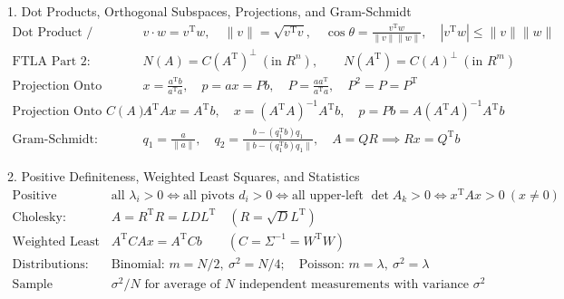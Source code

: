 \documentclass[11pt,a4paper,openany,oneside]{book}
\def\vect#1{#1}%
\def\uv#1{#1}%
\def\mathbf#1{#1}%
\newcommand{\vect}[1]{\mathbf{#1}}
\newcommand{\uv}[1]{\hat{\mathbf{#1}}}
\newcommand{\T}{\mathrm{T}}
\numberwithin{equation}{chapter}
\begin{document}
\begin{fs}{1. Dot Products, Orthogonal Subspaces, Projections, and Gram-Schmidt}
\begin{align*}
  \text{Dot Product / Length:}\quad & \vect{v}\cdot\vect{w} = \vect{v}^\T\vect{w}, \quad \|\vect{v}\| = \sqrt{\vect{v}^\T\vect{v}}, \quad \cos\theta = \frac{\vect{v}^\T\vect{w}}{\|\vect{v}\|\|\vect{w}\|}, \quad |\vect{v}^\T\vect{w}| \le \|\vect{v}\|\|\vect{w}\|\\
  \text{FTLA Part 2:}\quad & N(A) = C(A^\T)^\perp \ (\text{in } \mathbf{R}^n), \qquad N(A^\T) = C(A)^\perp \ (\text{in } \mathbf{R}^m)\\
  \text{Projection Onto Line:}\quad & \uv{x} = \frac{\vect{a}^\T\vect{b}}{\vect{a}^\T\vect{a}}, \quad \vect{p} = \vect{a}\uv{x} = P\vect{b}, \quad P = \frac{\vect{a}\vect{a}^\T}{\vect{a}^\T\vect{a}}, \quad P^2 = P = P^\T\\
  \text{Projection Onto } C(A):\quad & A^\T A\uv{\vect{x}} = A^\T\vect{b}, \quad \uv{\vect{x}} = (A^\T A)^{-1}A^\T\vect{b}, \quad \vect{p} = P\vect{b} = A(A^\T A)^{-1}A^\T\vect{b}\\
  \text{Gram-Schmidt:}\quad & \vect{q}_1 = \frac{\vect{a}}{\|\vect{a}\|}, \quad \vect{q}_2 = \frac{\vect{b} - (\vect{q}_1^\T\vect{b})\vect{q}_1}{\|\vect{b} - (\vect{q}_1^\T\vect{b})\vect{q}_1\|}, \quad A = QR \implies R\uv{\vect{x}} = Q^\T\vect{b}
\end{align*}
\end{fs}

\begin{fs}{2. Positive Definiteness, Weighted Least Squares, and Statistics}
\begin{align*}
  \text{Positive Definite:}\quad & \text{all } \lambda_i > 0 \iff \text{all pivots } d_i > 0 \iff \text{all upper-left } \det A_k > 0 \iff \vect{x}^\T A\vect{x} > 0 \ (\vect{x}\neq\vect{0})\\
  \text{Cholesky:}\quad & A = R^\T R = LDL^\T \quad (R = \sqrt{D}L^\T)\\
  \text{Weighted Least Squares:}\quad & A^\T C A\uv{\vect{x}} = A^\T C\vect{b} \qquad (C = \Sigma^{-1} = W^\T W)\\
  \text{Distributions:}\quad & \text{Binomial: } m = N/2, \ \sigma^2 = N/4; \quad \text{Poisson: } m = \lambda, \ \sigma^2 = \lambda\\
  \text{Sample Average:}\quad & \sigma^2/N \text{ for average of } N \text{ independent measurements with variance } \sigma^2
\end{align*}
\end{fs}
\end{document}
